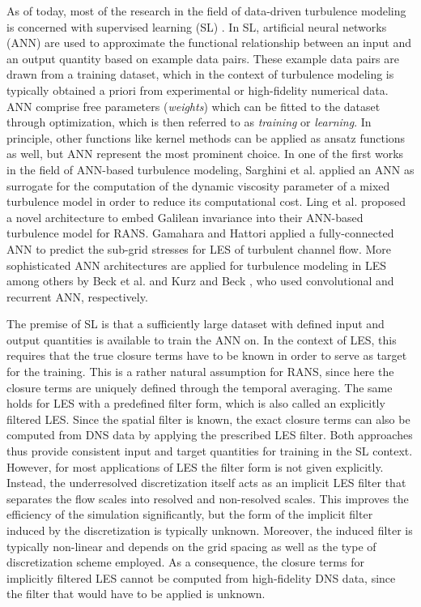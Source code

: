 As of today, most of the research in the field of data-driven turbulence modeling is concerned with supervised learning (SL) \cite{brunton2020machine,beck2021perspective,duraisamy2019turbulence}.
In SL, artificial neural networks (ANN) are used to approximate the functional relationship between an input and an output quantity based on example data pairs.
These example data pairs are drawn from a training dataset, which in the context of turbulence modeling is typically obtained a priori from experimental or high-fidelity numerical data.
ANN comprise free parameters (\textit{weights}) which can be fitted to the dataset through optimization, which is then referred to as \textit{training} or \textit{learning}.
In principle, other functions like kernel methods \cite{wenzel2021novel} can be applied as ansatz functions as well, but ANN represent the most prominent choice.
In one of the first works in the field of ANN-based turbulence modeling, Sarghini et al. \cite{sarghini2003neural} applied an ANN as surrogate for the computation of the dynamic viscosity parameter of a mixed turbulence model in order to reduce its computational cost.
Ling et al. \cite{ling2016reynolds} proposed a novel architecture to embed Galilean invariance into their ANN-based turbulence model for RANS.
Gamahara and Hattori \cite{gamahara2017searching} applied a fully-connected ANN to predict the sub-grid stresses for LES of turbulent channel flow.
More sophisticated ANN architectures are applied for turbulence modeling in LES among others by Beck et al. \cite{beck2019deep} and Kurz and Beck \cite{kurz2022machine}, who used convolutional and recurrent ANN, respectively.


The premise of SL is that a sufficiently large dataset with defined input and output quantities is available to train the ANN on.
In the context of LES, this requires that the true closure terms have to be known in order to serve as target for the training.
This is a rather natural assumption for RANS, since here the closure terms are uniquely defined through the temporal averaging.
The same holds for LES with a predefined filter form, which is also called an explicitly filtered LES.
Since the spatial filter is known, the exact closure terms can also be computed from DNS data by applying the prescribed LES filter.
Both approaches thus provide consistent input and target quantities for training in the SL context.
However, for most applications of LES the filter form is not given explicitly.
Instead, the underresolved discretization itself acts as an implicit LES filter that separates the flow scales into resolved and non-resolved scales.
This improves the efficiency of the simulation significantly, but the form of the implicit filter induced by the discretization is typically unknown.
Moreover, the induced filter is typically non-linear and depends on the grid spacing as well as the type of discretization scheme employed.
As a consequence, the closure terms for implicitly filtered LES cannot be computed from high-fidelity DNS data, since the filter that would have to be applied is unknown.

